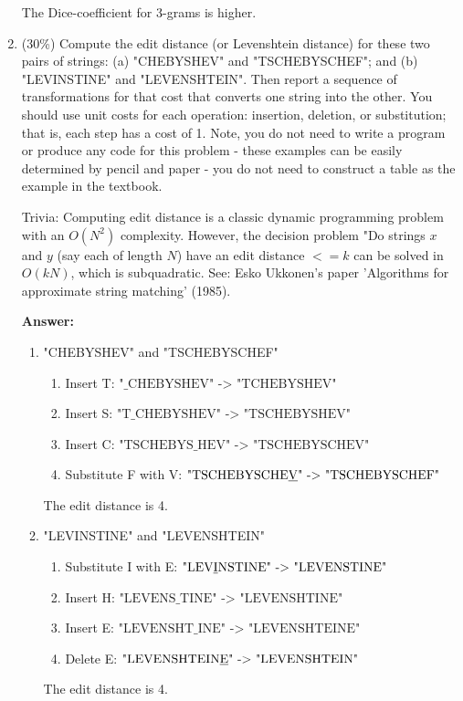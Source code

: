 \documentclass[11pt]{article}
\begin{document}
\begin{enumerate}
        The Dice-coefficient for 3-grams is higher.

        \item (30\%) Compute the edit distance (or Levenshtein distance) for these two pairs of strings: (a) "CHEBYSHEV" and "TSCHEBYSCHEF"; and (b) "LEVINSTINE" and "LEVENSHTEIN". Then report a sequence of transformations for that cost that converts one string into the other. You should use unit costs for each operation: insertion, deletion, or substitution; that is, each step has a cost of 1. Note, you do not need to write a program or produce any code for this problem - these examples can be easily determined by pencil and paper - you do not need to construct a table as the example in the textbook.

        Trivia: Computing edit distance is a classic dynamic programming problem with an $O(N^2)$ complexity. However, the decision problem "Do strings $x$ and $y$ (say each of length $N$) have an edit distance $<= k$ can be solved in $O(kN)$, which is subquadratic. See: Esko Ukkonen's paper 'Algorithms for approximate string matching' (1985).

        \textbf{Answer:}

        \begin{enumerate}
            \item "CHEBYSHEV" and "TSCHEBYSCHEF"
            \begin{enumerate}
                \item Insert T: $\text{"\_CHEBYSHEV" -> "TCHEBYSHEV"}$
                \item Insert S: $\text{"T\_CHEBYSHEV" -> "TSCHEBYSHEV"}$
                \item Insert C: $\text{"TSCHEBYS\_HEV" -> "TSCHEBYSCHEV"}$
                \item Substitute F with V: $\text{"TSCHEBYSCHE\underline{V}" -> "TSCHEBYSCHEF"}$
            \end{enumerate}
            The edit distance is 4.

            \item "LEVINSTINE" and "LEVENSHTEIN"
            \begin{enumerate}
                \item Substitute I with E: $\text{"LEV\underline{I}NSTINE" -> "LEVENSTINE"}$
                \item Insert H: $\text{"LEVENS\_TINE" -> "LEVENSHTINE"}$
                \item Insert E: $\text{"LEVENSHT\_INE" -> "LEVENSHTEINE"}$
                \item Delete E: $\text{"LEVENSHTEIN\underline{E}" -> "LEVENSHTEIN"}$
            \end{enumerate}
            The edit distance is 4.


\end{enumerate}
\end{enumerate}
\end{document}

